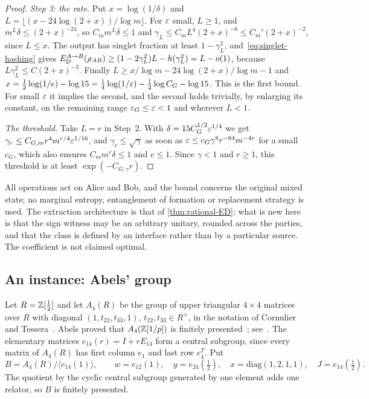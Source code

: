 \begin{proof}
\emph{Step 3: the rate.} Put $x=\log(1/\delta)$ and $L=\lfloor(x-24\log(2+x))/\log m\rfloor$. For $\varepsilon$ small, $L\ge1$, and
$m^L\delta\le(2+x)^{-24}$, so $C_mm^L\delta\le1$ and $\gamma_L\le C_mL^4(2+x)^{-6}\le C_m'(2+x)^{-2}$, since $L\le x$. The output has
singlet fraction at least $1-\gamma_L^2$, and~\eqref{eq:singlet-hashing} gives
$E_{\mathrm D}^{A\to B}(\rho_{AB})\ge(1-2\gamma_L^2)L-h(\gamma_L^2)=L-o(1)$, because $L\gamma_L^2\le C(2+x)^{-3}$. Finally
$L\ge x/\log m-24\log(2+x)/\log m-1$ and $x=\frac12\log(1/e)-\log15=\frac14\log(1/\varepsilon)-\frac12\log C_G-\log15$. This is the first
bound. For small $\varepsilon$ it implies the second, and the second holds trivially, by enlarging its constant, on the remaining
range $\varepsilon_G\le\varepsilon<1$ and wherever $L<1$.

\emph{The threshold.} Take $L=r$ in Step~2. With $\delta=15C_G^{1/2}\varepsilon^{1/4}$ we get $\gamma_r\le C_{G,m}r^4m^{r/4}\varepsilon^{1/16}$, and
$\gamma_r\le\sqrt\gamma$ as soon as $\varepsilon\le c_G\gamma^8r^{-64}m^{-4r}$ for a small $c_G$, which also ensures $C_mm^r\delta\le1$ and
$e\le1$. Since $\gamma<1$ and $r\ge1$, this threshold is at least $\exp(-C_{G,\gamma}r)$.
\end{proof}

All operations act on Alice and Bob, and the bound concerns the original mixed state; no marginal entropy, entanglement of
formation or replacement strategy is used. The extraction architecture is that of \cref{thm:rational-ED}; what is new here is that
the sign witness may be an arbitrary unitary, rounded across the parties, and that the class is defined by an interface rather
than by a particular source. The coefficient is not claimed optimal.

\subsection{An instance: Abels' group}\label{sec:floor-abels}

Let $R=\mathbb Z[\frac12]$ and let $A_4(R)$ be the group of upper triangular $4\times4$ matrices over $R$ with diagonal $(1,t_{22},t_{33},1)$,
$t_{22},t_{33}\in R^\times$, in the notation of Cornulier and Tessera~\cite{CT13}. Abels proved that $A_4(\mathbb Z[1/p])$ is finitely
presented~\cite{Abe79}; see~\cite[Introduction]{CT13}. The elementary matrices $e_{14}(r)=I+rE_{14}$ form a central subgroup, since
every matrix of $A_4(R)$ has first column $e_1$ and last row $e_4^T$. Put
\[
B=A_4(R)/\langle e_{14}(1)\rangle,\qquad w=e_{12}(1),\quad y=e_{24}(\tfrac12),\quad x=\mathrm{diag}(1,2,1,1),\quad J=e_{14}(\tfrac12).
\]
The quotient by the cyclic central subgroup generated by one element adds one relator, so $B$ is finitely presented.

